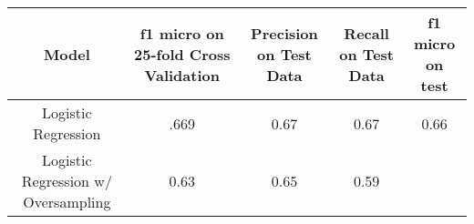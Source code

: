 \documentclass[11pt]{article}
\begin{document}
\begin{longtable}[]{@{}ccccc@{}}
\toprule
\begin{minipage}[b]{0.07\columnwidth}\centering\strut
Model\strut
\end{minipage} & \begin{minipage}[b]{0.25\columnwidth}\centering\strut
f1 micro on 25-fold Cross Validation\strut
\end{minipage} & \begin{minipage}[b]{0.20\columnwidth}\centering\strut
Precision on Test Data\strut
\end{minipage} & \begin{minipage}[b]{0.18\columnwidth}\centering\strut
Recall on Test Data\strut
\end{minipage} & \begin{minipage}[b]{0.16\columnwidth}\centering\strut
f1 micro on test\strut
\end{minipage}\tabularnewline
\midrule
\endhead
\begin{minipage}[t]{0.07\columnwidth}\centering\strut
Logistic Regression\strut
\end{minipage} & \begin{minipage}[t]{0.25\columnwidth}\centering\strut
.669\strut
\end{minipage} & \begin{minipage}[t]{0.20\columnwidth}\centering\strut
0.67\strut
\end{minipage} & \begin{minipage}[t]{0.18\columnwidth}\centering\strut
0.67\strut
\end{minipage} & \begin{minipage}[t]{0.16\columnwidth}\centering\strut
0.66\strut
\end{minipage}\tabularnewline
\begin{minipage}[t]{0.07\columnwidth}\centering\strut
Logistic Regression w/ Oversampling\strut
\end{minipage} & \begin{minipage}[t]{0.25\columnwidth}\centering\strut
0.63\strut
\end{minipage} & \begin{minipage}[t]{0.20\columnwidth}\centering\strut
0.65\strut
\end{minipage} & \begin{minipage}[t]{0.18\columnwidth}\centering\strut
0.59\strut
\end{minipage} & \begin{minipage}[t]{0.16\columnwidth}\centering\strut

\end{minipage}
\end{longtable}
\end{document}
